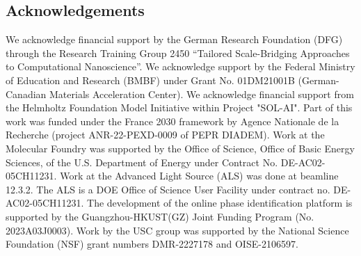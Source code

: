 \documentclass[a4paper]{article}
\begin{document}
\subsection*{Acknowledgements}
We acknowledge financial support by the German Research Foundation (DFG) through the Research Training Group 2450 “Tailored Scale-Bridging Approaches to Computational Nanoscience”. We acknowledge support by the Federal Ministry of Education and Research (BMBF) under Grant No. 01DM21001B (German-Canadian Materials Acceleration Center). We acknowledge financial support from the Helmholtz Foundation Model Initiative within Project "SOL-AI". Part of this work was funded under the France 2030 framework by Agence Nationale de la Recherche (project ANR-22-PEXD-0009 of PEPR DIADEM). Work at the Molecular Foundry was supported by the Office of Science, Office of Basic Energy Sciences, of the U.S. Department of Energy under Contract No. DE-AC02-05CH11231. Work at the Advanced Light Source (ALS) was done at beamline 12.3.2. The ALS is a DOE Office of Science User Facility under contract no. DE-AC02-05CH11231. The development of the online phase identification platform is supported by the Guangzhou-HKUST(GZ) Joint Funding Program (No. 2023A03J0003). Work by the USC group was supported by the National Science Foundation (NSF) grant numbers DMR-2227178 and OISE-2106597. 




\printnomenclature

\clearpage



\end{document}
